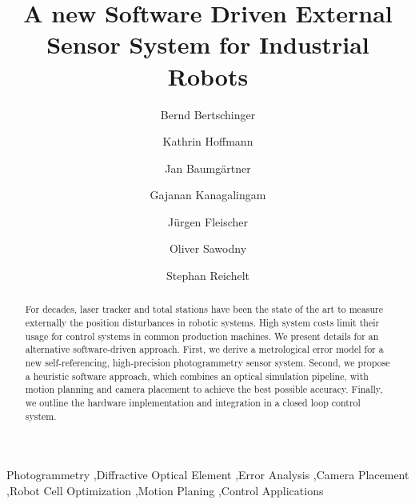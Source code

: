 \documentclass[5p,times,procedia]{elsarticle}
\begin{document}
\begin{frontmatter}
%
	\title{A new Software Driven External Sensor System for Industrial Robots}
%	
	\author[a]{Bernd Bertschinger\corref{*}}
	\author[b]{Kathrin Hoffmann}
	\author[c]{Jan Baumgärtner}
	\author[b]{Gajanan Kanagalingam}
	\author[c]{Jürgen Fleischer}
	\author[b]{Oliver Sawodny}
	\author[a]{Stephan Reichelt}
	\address[a]{Institute of Applied Optics, University of Stuttgart - ITO, Pfaffenwaldring 9, 70569 Stuttgart, Germany}
	\address[b]{Institute for System Dynamics, University of Stuttgart - ISYS, Waldburgstr. 17/19, 70563 Stuttgart, Germany}
	\address[c]{Institute of Production Science, Karlsruhe Institute of Technology - WBK, Kaiserstraße 12, 76131 Karlsruhe, Germany}
	
	\begin{abstract}
		For decades, laser tracker and total stations have been the state of the art to measure externally the position disturbances in robotic systems. High system costs limit their usage for control systems in common production machines. We present details for an alternative software-driven approach.
		First, we derive a metrological error model for a new self-referencing, high-precision photogrammetry sensor system. Second, we propose a heuristic software approach, which combines an optical simulation pipeline, with motion planning and camera placement to achieve the best possible accuracy. Finally, we outline the hardware implementation and integration in a closed loop control system.
	\end{abstract}
	
	\begin{keyword}
		Photogrammetry \sep Diffractive Optical Element \sep Error Analysis \sep Camera Placement \sep Robot Cell Optimization   \sep	Motion Planing \sep Control Applications
	\end{keyword}
\end{frontmatter}
%
\end{document}
